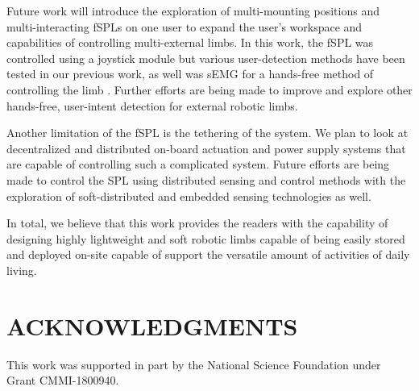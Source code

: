 \documentclass[letterpaper, 10 pt, conference]{ieeeconf}  %
\begin{document}
Future work will introduce the exploration of multi-mounting positions and multi-interacting fSPLs on one user to expand the user’s workspace and capabilities of controlling multi-external limbs. In this work, the fSPL was controlled using a joystick module but various user-detection methods have been tested in our previous work, as well was sEMG for a hands-free method of controlling the limb \cite{Nguyen2018}. Further efforts are being made to improve and explore other hands-free, user-intent detection for external robotic limbs.

Another limitation of the fSPL is the tethering of the system. We plan to look at decentralized and distributed on-board actuation and power supply systems that are capable of controlling such a complicated system. Future efforts are being made to control the SPL using distributed sensing and control methods \cite{Wenlong2018} with the exploration of soft-distributed and embedded sensing technologies as well. 

In total, we believe that this work provides the readers with the capability of designing highly lightweight and soft robotic limbs capable of being easily stored and deployed on-site capable of support the versatile amount of activities of daily living.





\section*{ACKNOWLEDGMENTS} 
This work was supported in part by the National Science Foundation under Grant CMMI-1800940.







%
\end{document}
